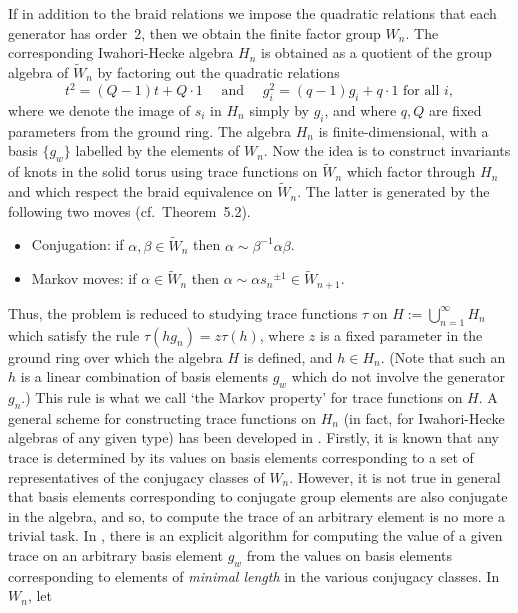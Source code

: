 \noindent If in addition to the braid relations we impose the quadratic
relations that  each generator has order~$2$, then  we obtain the finite factor
group  $W_n$. 
\bigbreak
The corresponding Iwahori-Hecke
algebra $H_n$ is obtained as a   quotient of the group  algebra   of $\tilde{W}_n$
by factoring out the quadratic  relations  
\[ t^2=(Q-1)t+Q \cdot 1  \quad \mbox{ and } \quad g_i^2=(q-1)g_i+q \cdot 1 
\mbox{ for all $i$},\]  
where we denote the image of $s_i$ in  $H_n$ simply by $g_i$, and where $q, Q$ are
fixed parameters from the ground ring. The  algebra $H_n$ is finite-dimensional,
with a basis $\{g_w\}$ labelled by the elements of $W_n$. Now the idea  is to
construct invariants  of knots in the solid torus using trace    functions on
$\tilde{W}_n$  which  factor through $H_n$ and which   respect  the braid
equivalence on  $\tilde{W}_n$. The latter is generated by the following two moves 
(cf.\ Theorem~5.2).  \begin{itemize}
\item[(i)] Conjugation: if $\alpha,\beta \in \tilde{W}_n$
then $\alpha \sim \beta ^{-1}\alpha\beta$.
\item[(ii)] Markov moves: if $\alpha \in \tilde{W}_n$ then $\alpha \sim
\alpha{s_n}^{\pm 1}\in \tilde{W}_{n+1}$. 
\end{itemize} 
\noindent Thus, the problem is  reduced to studying trace
functions $\tau$ on $H:= \bigcup_{n=1}^{\infty} H_n$ which  satisfy the rule 
$\tau(hg_n)=z\tau(h)$, where $z$ is a fixed parameter  in the ground  ring over
which the algebra $H$ is defined, and $h \in H_n$. (Note that such an $h$ is  a
linear combination of basis elements $g_w$ which do  not involve the  generator
$g_n$.) This rule is what  we call `the Markov property' for trace functions on
$H$.
\bigbreak
A general  scheme for constructing  trace functions on $H_n$ (in fact,
for  Iwahori-Hecke algebras of any given  type)  has been developed in
\cite{GP}. Firstly, it is known that any trace is determined by its values on basis
elements corresponding to a set of representatives of the conjugacy classes of
$W_n$. However, it is not true in general that basis elements
 corresponding to conjugate group elements are also conjugate in the algebra, and so,
to compute the trace of an arbitrary element is no more a trivial task.  In
\cite{GP}, there is an explicit algorithm  for computing the value of a given trace
on an arbitrary basis element $g_w$ from the values on basis elements corresponding
to elements  of {\it minimal length} in the various conjugacy classes. 
\bigbreak
\noindent In $W_n$, let
